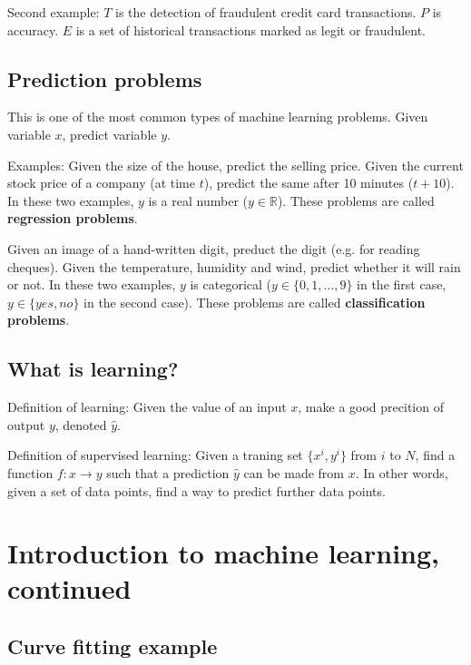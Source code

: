 \documentclass[a4paper,12pt]{article}
\begin{document}
Second example: $T$ is the detection of fraudulent credit card transactions. $P$ is accuracy. $E$ is a set of historical transactions marked as legit or fraudulent. 

\subsection{Prediction problems}

This is one of the most common types of machine learning problems. Given variable $x$, predict variable $y$. 

Examples: Given the size of the house, predict the selling price. Given the current stock price of a company (at time $t$), predict the same after 10 minutes ($t+10$). In these two examples, $y$ is a real number ($y \in \mathbb{R}$). These problems are called \textbf{regression problems}. 

Given an image of a hand-written digit, preduct the digit (e.g. for reading cheques). Given the temperature, humidity and wind, predict whether it will rain or not. In these two examples, $y$ is categorical ($y \in \{0, 1, ..., 9\}$ in the first case, $y \in \{yes, no\}$ in the second case). These problems are called \textbf{classification problems}. 

\subsection{What is learning?}

Definition of learning: Given the value of an input $x$, make a good precition of output $y$, denoted $\hat y$. 

Definition of supervised learning: Given a traning set $\{ x^i, y^i\}$ from $i$ to $N$, find a function $f: x \rightarrow y$ such that a prediction $\hat y$ can be made from $x$. In other words, given a set of data points, find a way to predict further data points. 


\clearpage

\section{Introduction to machine learning, continued}

\subsection{Curve fitting example}
\end{document}
